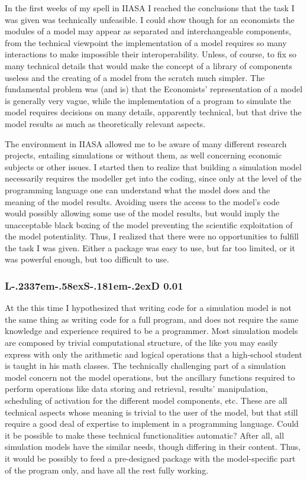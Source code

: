 \documentclass [11pt,a4paper] {book}
\def\LsD{{L\kern-.2337em\lower-.58ex\hbox{S}\kern-.181em\lower-.2ex\hbox{D}}\xspace}
\begin{document}
In the first weeks of my spell in IIASA I reached the conclusions that the task I was given was technically unfeasible. I could show though for an economists the modules of a model may appear as separated and interchangeable components, from the technical viewpoint the implementation of a model requires so many interactions to make impossible their interoperability. Unless, of course, to fix so many technical details that would make the concept of a library of components useless and the creating of a model from the scratch much simpler. The fundamental problem was (and is) that the Economists' representation of a model is generally very vague, while the implementation of a program to simulate the model requires decisions on many details, apparently technical, but that drive the model results as much as theoretically relevant aspects.


The environment in IIASA allowed me to be aware of many different research projects, entailing simulations or without them, as well concerning economic subjects or other issues. I started then to realize that building a simulation model necessarily requires the modeller get into the coding, since only at the level of the programming language one can understand what the model does and the meaning of the model results. Avoiding users the access to the model's code would possibly allowing some use of the model results, but would imply the unacceptable black boxing of the model preventing the scientific exploitation of the model potentiality. Thus, I realized that there were no opportunities to fulfill the task I was given. Either a package was easy to use, but far too limited, or it was powerful enough, but too difficult to use. 

\subsubsection{\LsD 0.01}

At the this time I hypothesized that writing code for a simulation model is not the same thing as writing code for a full program, and does not require the same knowledge and experience required to be a programmer. Most simulation models are composed by trivial computational structure, of the like you may easily express with only the arithmetic and logical operations that a high-school student is taught in his math classes. The technically challenging part of a simulation model concern not the model operations, but the ancillary functions required to perform operations like data storing and retrieval, results' manipulation, scheduling of activation for the different model components, etc. These are all technical aspects whose meaning is trivial to the user of the model, but that still require a good deal of expertise to implement in a programming language. Could it be possible to make these technical functionalities automatic? After all, all simulation models have the similar needs, though differing in their content. Thus, it would be possibly to feed a pre-designed package with the model-specific part of the program only, and have all the rest fully working.
\end{document}
